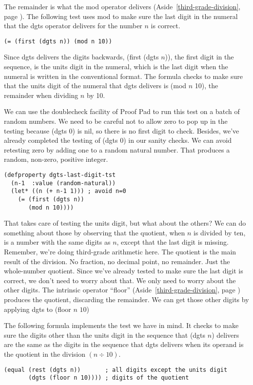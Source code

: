The remainder is
what the mod operator delivers (Aside~\ref{third-grade-division}, page \pageref{third-grade-division}).
The following test uses mod to make sure the last digit in the numeral
that the dgts operator delivers for the number $n$ is correct.
\begin{Verbatim}
(= (first (dgts n)) (mod n 10))
\end{Verbatim}

Since dgts delivers the digits backwards,
(first (dgts $n$)), the first digit in the sequence,
is the units digit in the numeral, which is the last digit
when the numeral is written in the conventional format.
The formula checks to make sure that
the units digit of the numeral that dgts delivers is (mod $n$ 10),
the remainder when dividing $n$ by 10.

We can use the doublecheck facility of Proof Pad to run this test on a batch of random numbers.
We need to be careful not to allow zero to pop up in the testing
because (dgts 0) is nil, so there is no first digit to check.
Besides, we've already completed the testing of (dgts 0) in our sanity checks.
We can avoid retesting zero by adding one to a random natural number.
That produces a random, non-zero, positive integer.
\begin{Verbatim}
(defproperty dgts-last-digit-tst
  (n-1  :value (random-natural))
  (let* ((n (+ n-1 1))) ; avoid n=0
    (= (first (dgts n))
       (mod n 10))))
\end{Verbatim}

That takes care of testing the units digit, but what about the others?
We can do something about those by observing that the quotient,
when $n$ is divided by ten,
is a number with the same digits as $n$,
except that the last digit is missing.
Remember, we're doing third-grade arithmetic here.
The quotient is the main result of the division.
No fraction, no decimal point, no remainder. Just the whole-number quotient.
Since we've already tested to make sure the last digit is correct,
we don't need to worry about that.
We only need to worry about the other digits.
The intrinsic operator ``floor'' 
(Aside~\ref{third-grade-division}, page \pageref{third-grade-division})
produces the quotient, discarding the remainder.
We can get those other digits by applying dgts to (floor $n$ $10$)

The following formula implements the test we have in mind.
It checks to make sure the digits other than the units digit
in the sequence that (dgts $n$) delivers
are the same as the digits in the sequence that
dgts delivers when its operand is the quotient in
the division $(n \div 10)$.
\begin{Verbatim}
(equal (rest (dgts n))       ; all digits except the units digit
       (dgts (floor n 10)))) ; digits of the quotient
\end{Verbatim}

